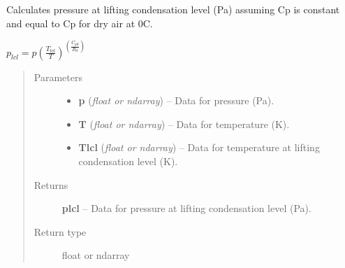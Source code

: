\documentclass[letterpaper,10pt,english]{sphinxmanual}
\begin{document}
\begin{fulllineitems}
\label{atmos:atmos.equations.plcl_from_p_T_Tlcl}
Calculates pressure at lifting condensation level (Pa) assuming Cp is constant
and equal to Cp for dry air at 0C.

\(p_{lcl} = p (\frac{T_{lcl}}{T})^(\frac{C_{pd}}{R_d})\)
\begin{quote}\begin{description}
\item[{Parameters}] \leavevmode\begin{itemize}
\item {} 
\textbf{p} (\emph{float or ndarray}) -- Data for pressure (Pa).

\item {} 
\textbf{T} (\emph{float or ndarray}) -- Data for temperature (K).

\item {} 
\textbf{Tlcl} (\emph{float or ndarray}) -- Data for temperature at lifting condensation level (K).

\end{itemize}

\item[{Returns}] \leavevmode
\textbf{plcl} --
Data for pressure at lifting condensation level (Pa).

\item[{Return type}] \leavevmode
float or ndarray

\end{description}\end{quote}

\end{fulllineitems}

\end{document}

